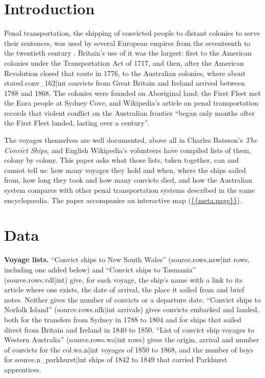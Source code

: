 \documentclass[11pt,a4paper]{article}
\begin{document}
\section{Introduction}
Penal transportation, the shipping of convicted people to distant colonies to serve their sentences, was used by several European empires from the seventeenth to the twentieth century \citep{wiki}. Britain's use of it was the largest: first to the American colonies under the Transportation Act of 1717, and then, after the American Revolution closed that route in 1776, to the Australian colonies, where about {{stated.conv_162|int}} convicts from Great Britain and Ireland arrived between 1788 and 1868. The colonies were founded on Aboriginal land: the First Fleet met the Eora people at Sydney Cove, and Wikipedia's article on penal transportation records that violent conflict on the Australian frontier ``began only months after the First Fleet landed, lasting over a century''.

The voyages themselves are well documented, above all in Charles Bateson's \emph{The Convict Ships}, and English Wikipedia's volunteers have compiled lists of them, colony by colony. This paper asks what those lists, taken together, can and cannot tell us: how many voyages they hold and when, where the ships sailed from, how long they took and how many convicts died, and how the Australian system compares with other penal transportation systems described in the same encyclopaedia. The paper accompanies an interactive map (\url{{{meta.page}}}).

\section{Data}
\textbf{Voyage lists.} ``Convict ships to New South Wales'' ({{source.rows.nsw|int}} rows, including one added below) and ``Convict ships to Tasmania'' ({{source.rows.vdl|int}}) give, for each voyage, the ship's name with a link to its article where one exists, the date of arrival, the place it sailed from and brief notes. Neither gives the number of convicts or a departure date. ``Convict ships to Norfolk Island'' ({{source.rows.nfk|int}} arrivals) gives convicts embarked and landed, both for the transfers from Sydney in 1788 to 1804 and for ships that sailed direct from Britain and Ireland in 1840 to 1850. ``List of convict ship voyages to Western Australia'' ({{source.rows.wa|int}} rows) gives the origin, arrival and number of convicts for the {{col.wa.n|int}} voyages of 1850 to 1868, and the number of boys for {{source.n_parkhurst|int}} ships of 1842 to 1849 that carried Parkhurst apprentices.
\end{document}
